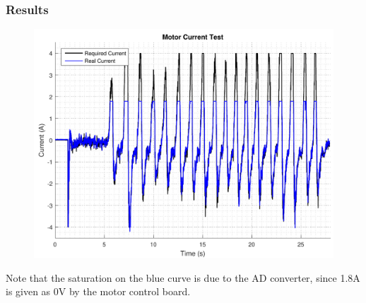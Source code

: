 \subsubsection{Results}
\begin{figure}[H]
	\includegraphics[scale=.65]{figures/motorCurrentTest}
	\centering
	\caption{}
\end{figure} \label{motorCurrentTest}

Note that the saturation on the blue curve is due to the AD converter, since 1.8A is given as 0V by the motor control board.